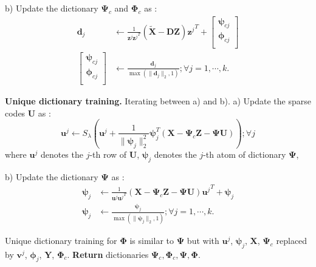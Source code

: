 \documentclass{article}
\begin{document}
\begin{algorithm}[t]
\begin{algorithmic}[1]
			\STATE
			b) Update the dictionary $\boldsymbol{\Psi}_{c}$ and $\boldsymbol{\Phi}_{c}$ as :
			\begin{align*}
			\mathbf{d}_j &\leftarrow \frac{1}{\mathbf{z}^j {\mathbf{z}^j}^T} (\widetilde{\mathbf{X}} - \mathbf{D}\mathbf{Z}) {\mathbf{z}^j}^T +
			\begin{bmatrix}
			\boldsymbol{\psi}_{cj}  \\
			\boldsymbol{\phi}_{cj}  \\
			\end{bmatrix}
			\\
			\begin{bmatrix}
			\boldsymbol{\psi}_{cj}  \\
			\boldsymbol{\phi}_{cj}  \\
			\end{bmatrix}
			&\leftarrow \frac{\mathbf{d}_j}{\max(\|\mathbf{d}_j \|_2, 1)} 
			; \forall j=1,\cdots, k.
			\end{align*}
			
			\STATE
			\textbf{Unique dictionary training.} Iterating between a) and b).
			\STATE
			a) Update the sparse codes $\mathbf{U}$ as :
			\begin{equation*}
			\mathbf{u}^j \leftarrow S_\lambda\left( \mathbf{u}^j + \frac{1}{\|\boldsymbol{\psi}_j \|_2^2} \boldsymbol{\psi}_j^T (\mathbf{X} - \boldsymbol{\Psi}_c \mathbf{Z} - \boldsymbol{\Psi} \mathbf{U}) \right) ; \forall j
			\end{equation*}
			where $\mathbf{u}^j$ denotes the $j$-th row of $\mathbf{U}$, $\boldsymbol{\psi}_j$ denotes the $j$-th atom of dictionary $\boldsymbol{\Psi}$,
			
			\STATE
			b) Update the dictionary $\boldsymbol{\Psi}$ as :
			\begin{align*}
			\boldsymbol{\psi}_j &\leftarrow \frac{1}{\mathbf{u}^j {\mathbf{u}^j}^T} (\mathbf{X} - \boldsymbol{\Psi}_c \mathbf{Z} - \boldsymbol{\Psi} \mathbf{U}) {\mathbf{u}^j}^T + \boldsymbol{\psi}_j 
			\\
			\boldsymbol{\psi}_j
			&\leftarrow \frac{\boldsymbol{\psi}_j}{\max(\|\boldsymbol{\psi}_j \|_2, 1)} 
			; \forall j=1,\cdots, k.
			\end{align*}
			
			\STATE
			\textrm{Unique dictionary training for $\boldsymbol{\Phi}$ is similar to $\boldsymbol{\Psi}$ but with $\mathbf{u}^j$, $\boldsymbol{\psi}_j$, $\mathbf{X}$, $\boldsymbol{\Psi}_c$ replaced by $\mathbf{v}^j$, $\boldsymbol{\phi}_j$}, $\mathbf{Y}$, $\boldsymbol{\Phi}_c$.
			\STATE
			\textbf{Return} dictionaries $\boldsymbol{\Psi}_{c}, \boldsymbol{\Phi}_{c},\boldsymbol{\Psi}, \boldsymbol{\Phi}$.
		\end{algorithmic}
\end{algorithm}	
\end{document}
